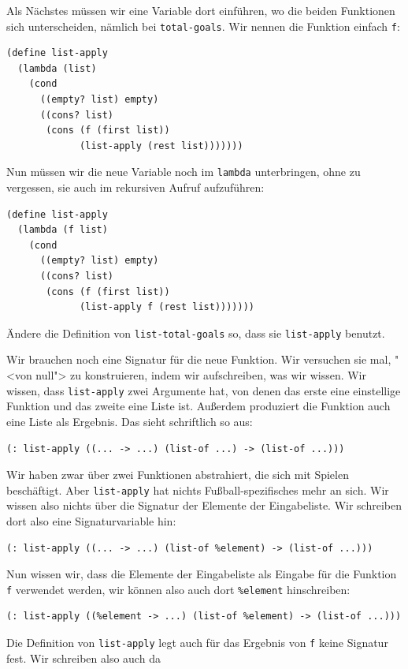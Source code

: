 Als Nächstes müssen wir eine Variable dort einführen, wo die beiden
Funktionen sich unterscheiden, nämlich bei \lstinline{total-goals}.
Wir nennen die Funktion einfach \lstinline{f}:
%
\begin{lstlisting}
(define list-apply
  (lambda (list)
    (cond
      ((empty? list) empty)
      ((cons? list)
       (cons (f (first list))
             (list-apply (rest list)))))))  
\end{lstlisting}
%
Nun müssen wir die neue Variable noch im \lstinline{lambda}
unterbringen, ohne zu vergessen, sie auch im rekursiven Aufruf
aufzuführen:
%
\begin{lstlisting}
(define list-apply
  (lambda (f list)
    (cond
      ((empty? list) empty)
      ((cons? list)
       (cons (f (first list))
             (list-apply f (rest list)))))))
\end{lstlisting}
%
\begin{aufgabeinline}
  Ändere die Definition von \lstinline{list-total-goals} so, dass sie
  \lstinline{list-apply} benutzt.
\end{aufgabeinline}
%
Wir brauchen noch eine Signatur für die neue Funktion.  Wir versuchen
sie mal, "<von null"> zu konstruieren, indem wir aufschreiben, was wir
wissen.  Wir wissen, dass \lstinline{list-apply} zwei Argumente hat,
von denen das erste eine einstellige Funktion und das zweite eine
Liste ist.  Außerdem produziert die Funktion auch eine Liste als
Ergebnis.  Das sieht schriftlich so aus:
%
\begin{lstlisting}
(: list-apply ((... -> ...) (list-of ...) -> (list-of ...)))
\end{lstlisting}
%
Wir haben zwar über zwei Funktionen abstrahiert, die sich mit Spielen
beschäftigt.  Aber \lstinline{list-apply} hat nichts
Fußball-spezifisches mehr an sich.  Wir wissen also nichts über die
Signatur der Elemente der Eingabeliste.  Wir schreiben dort also eine
Signaturvariable hin:
%
\begin{lstlisting}
(: list-apply ((... -> ...) (list-of %element) -> (list-of ...)))
\end{lstlisting}
%
Nun wissen wir, dass die Elemente der Eingabeliste als Eingabe für die
Funktion \lstinline{f} verwendet werden, wir können also auch dort
\lstinline{%element} hinschreiben:
%
\begin{lstlisting}
(: list-apply ((%element -> ...) (list-of %element) -> (list-of ...)))
\end{lstlisting}
%
Die Definition von \lstinline{list-apply} legt auch für das Ergebnis
von  \lstinline{f} keine Signatur fest.  Wir schreiben also auch da
